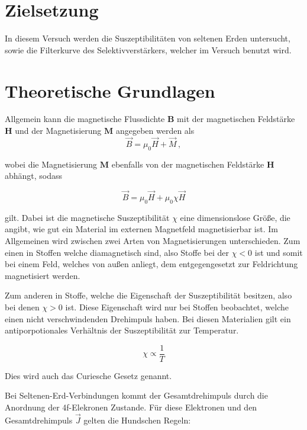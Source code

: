 \section{Zielsetzung}
In diesem Versuch werden die Suszeptibilitäten von seltenen Erden untersucht, sowie die Filterkurve des Selektivverstärkers, welcher im Versuch benutzt wird.

\section{Theoretische Grundlagen}
Allgemein kann die magnetische Flussdichte $\symbf{B}$ mit der magnetischen Feldstärke $\symbf{H}$ und der Magnetisierung $\symbf{M}$ angegeben werden als
\begin{equation}
        \vec B = \mu_0 \vec H + \vec M \, ,
    \label{eqn:b}
\end{equation}

\noindent
wobei die Magnetisierung $\symbf{M}$ ebenfalls von der magnetischen Feldstärke $\symbf{H}$ abhängt, sodass 

\begin{equation}
        \label{eqn:m}
        \vec B = \mu_0 \vec H + \mu_0 \chi \vec H 
\end{equation}

\noindent
gilt. Dabei ist die magnetische Suszeptibilität $\chi$ eine dimensionslose Größe, die angibt, wie gut ein Material im externen Magnetfeld magnetisierbar ist. 
Im Allgemeinen wird zwischen zwei Arten von Magnetisierungen unterschieden. Zum einen in Stoffen welche diamagnetisch sind, also Stoffe bei der  $\chi < 0$ ist 
und somit bei einem Feld, welches von außen anliegt, dem entgegengesetzt zur Feldrichtung magnetisiert werden. 

\noindent
Zum anderen in Stoffe, welche die Eigenschaft der Suszeptibilität besitzen, also bei denen $\chi > 0$ ist. Diese Eigenschaft wird nur bei Stoffen beobachtet,
welche einen nicht verschwindenden Drehimpuls haben. Bei diesen Materialien gilt ein antiporpotionales Verhältnis der 
Suszeptibilität zur Temperatur. 

\begin{equation}
        \chi \propto \frac{1}{T}
\end{equation}

\noindent
Dies wird auch das Curiesche Gesetz genannt. 

\noindent
Bei Seltenen-Erd-Verbindungen kommt der Gesamtdrehimpuls durch die Anordnung der 4f-Elekronen Zustande.
Für diese Elektronen und den Gesamtdrehimpuls $\vec{J}$ gelten die Hundschen Regeln:

